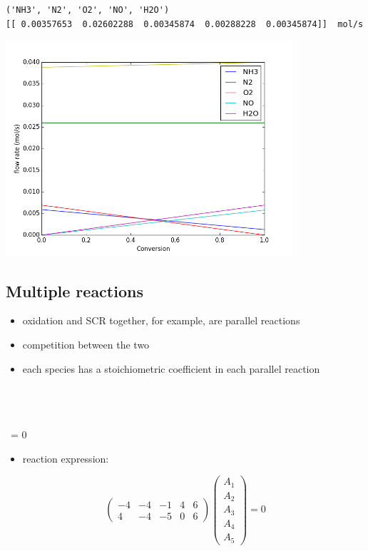 \documentclass[11pt]{article}
\begin{document}
\begin{verbatim}
('NH3', 'N2', 'O2', 'NO', 'H2O')
[[ 0.00357653  0.02602288  0.00345874  0.00288228  0.00345874]]  mol/s
\end{verbatim}

\includegraphics[width=0.8\textwidth]{./figs/conversion1.png}

\subsection{Multiple reactions}
\label{sec-6-4}
\begin{itemize}
\item {} oxidation and SCR together, for example, are parallel reactions
\item competition between the two
\item each species has a stoichiometric coefficient in each parallel reaction
\end{itemize}

\begin{center}
 \\
\\
\vspace{1em}
 \\
\ = 0\\
\end{center}

\begin{itemize}
\item reaction expression:
\end{itemize}

\begin{equation}
\left (
\begin{array}{rrrrr}
-4 & -4 & -1 & 4 & 6 \\
4 & -4 & -5 & 0 & 6
\end{array}
\right )
\left (
\begin{array}{rr}
A_{1} \\
A_{2} \\
A_{3} \\
A_{4} \\
A_{5}
\end{array}
\right ) = 0
\end{equation}
\end{document}

